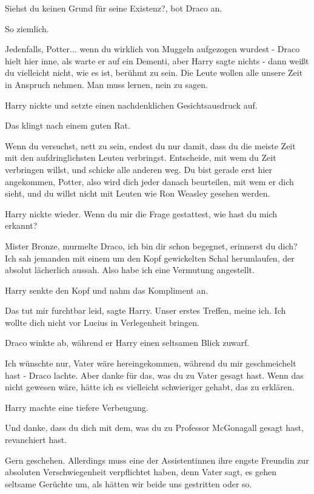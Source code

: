 \glqq Siehst du keinen Grund für seine Existenz?\grqq{}, bot Draco an.

\glqq So ziemlich.\grqq{}

\glqq Jedenfalls, Potter... wenn du wirklich von Muggeln aufgezogen wurdest
-\grqq{} Draco hielt hier inne, als warte er auf ein Dementi, aber Harry sagte
nichts \glqq - dann weißt du vielleicht nicht, wie es ist, berühmt zu sein. Die
Leute wollen alle unsere Zeit in Anspruch nehmen. Man muss lernen, nein zu
sagen.\grqq{}

Harry nickte und setzte einen nachdenklichen Gesichtsausdruck auf.

\glqq Das klingt nach einem guten Rat.\grqq{}

\glqq Wenn du versuchst, nett zu sein, endest du nur damit, dass du die meiste
Zeit mit den aufdringlichsten Leuten verbringst. Entscheide, mit wem du Zeit
verbringen willst, und schicke alle anderen weg. Du bist gerade erst hier
angekommen, Potter, also wird dich jeder danach beurteilen, mit wem er dich
sieht, und du willst nicht mit Leuten wie Ron Weasley gesehen werden.\grqq{}

Harry nickte wieder. \glqq Wenn du mir die Frage gestattest, wie hast du mich
erkannt?\grqq{}

\glqq Mister Bronze\grqq{}, murmelte Draco, \glqq ich bin dir schon begegnet,
erinnerst du dich? Ich sah jemanden mit einem um den Kopf gewickelten Schal
herumlaufen, der absolut lächerlich aussah. Also habe ich eine Vermutung
angestellt.\grqq{}

Harry senkte den Kopf und nahm das Kompliment an.

\glqq Das tut mir furchtbar leid\grqq{}, sagte Harry. \glqq Unser erstes
Treffen, meine ich. Ich wollte dich nicht vor Lucius in Verlegenheit
bringen.\grqq{}

Draco winkte ab, während er Harry einen seltsamen Blick zuwarf.

\glqq Ich wünschte nur, Vater wäre hereingekommen, während du mir geschmeichelt
hast -\grqq{} Draco lachte. \glqq Aber danke für das, was du zu Vater gesagt
hast. Wenn das nicht gewesen wäre, hätte ich es vielleicht schwieriger gehabt,
das zu erklären.\grqq{}

Harry machte eine tiefere Verbeugung.

\glqq Und danke, dass du dich mit dem, was du zu Professor McGonagall gesagt
hast, revanchiert hast.\grqq{}

\glqq Gern geschehen. Allerdings muss eine der Assistentinnen ihre engste
Freundin zur absoluten Verschwiegenheit verpflichtet haben, denn Vater sagt, es
gehen seltsame Gerüchte um, als hätten wir beide uns gestritten oder so.\grqq{}

